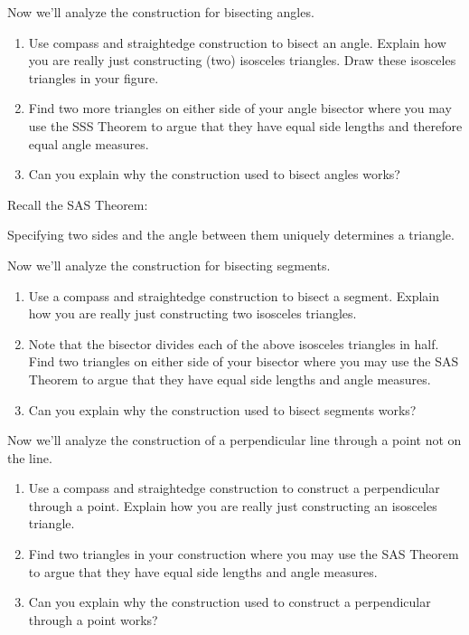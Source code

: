 \documentclass[nooutcomes]{ximera}
\begin{document}
\begin{problem} Now we'll analyze the construction for bisecting angles.
\begin{enumerate}
\item Use compass and straightedge construction to bisect an
  angle. Explain how you are really just constructing (two)
  isosceles triangles. Draw these isosceles triangles in your figure.
\item Find two more triangles on either side of your angle bisector where
  you may use the SSS Theorem to argue that they have equal side
  lengths and therefore equal angle measures.
\item Can you explain why the construction used to bisect angles
  works?
\end{enumerate}
\vfill
\end{problem}

\newpage

Recall the SAS Theorem:

\begin{theorem}[SAS] 
Specifying two sides and the angle between them uniquely determines a
triangle.
\end{theorem}


\begin{problem} Now we'll analyze the construction for bisecting segments.
\begin{enumerate} 
\item Use a compass and straightedge construction to bisect a
  segment. Explain how you are really just constructing two
  isosceles triangles.
\item Note that the bisector divides each of the above isosceles
  triangles in half. Find two triangles on either side of your
  bisector where you may use the SAS Theorem to argue that they have
  equal side lengths and angle measures.
\item Can you explain why the construction used to bisect segments
  works?
\end{enumerate}
\vfill
\end{problem}




\begin{problem} 
Now we'll analyze the construction of a perpendicular line through a
point not on the line.
\begin{enumerate}
\item Use a compass and straightedge construction to construct a
  perpendicular through a point. Explain how you are really just
  constructing an isosceles triangle.
\item Find two triangles in your construction where you may use the
  SAS Theorem to argue that they have equal side lengths and angle
  measures.
\item Can you explain why the construction used to construct a
  perpendicular through a point works?
\end{enumerate}
\vfill
\end{problem}
\end{document}
